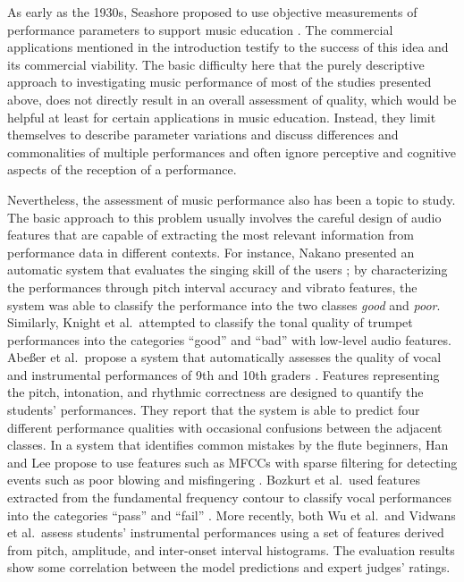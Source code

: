 \documentclass{ws-ijsc}
\begin{document}
As early as the 1930s, Seashore proposed to use objective measurements of performance parameters to support music education \cite{seashore_psychology_1938}. The commercial applications mentioned in the introduction testify to the success of this idea and its commercial viability. The basic difficulty here that the purely descriptive approach to investigating music performance of most of the studies presented above, does not directly result in an overall assessment of quality, which would be helpful at least for certain applications in music education. Instead, they limit themselves to describe parameter variations and discuss differences and commonalities of multiple performances and often ignore perceptive and cognitive aspects of the reception of a performance. 

Nevertheless, the assessment of music performance also has been a topic to study. The basic approach to this problem usually involves the careful design of audio features that are capable of extracting the most relevant information from performance data in different contexts. For instance, Nakano presented an automatic system that evaluates the singing skill of the users \cite{Nakano2006a}; by characterizing the performances through pitch interval accuracy and vibrato features, the system was able to classify the performance into the two classes \textit{good} and \textit{poor}.  Similarly, Knight et al.\ attempted to classify the tonal quality of trumpet performances into the categories ``good'' and ``bad'' with low-level audio features.
Abe{\ss}er et al.\ propose a system that automatically assesses the quality of vocal and instrumental performances of 9th and 10th graders \cite{Abeßer2013}. Features representing the pitch, intonation, and rhythmic correctness are designed to quantify the students' performances. They report that the system is able to predict four different performance qualities with occasional confusions between the adjacent classes. 
In a system that identifies common mistakes by the flute beginners, Han and Lee propose to use features such as MFCCs with sparse filtering for detecting events such as poor blowing and misfingering \cite{Han2014}. Bozkurt et al.\ used features extracted from the fundamental frequency contour to classify vocal performances into the categories ``pass'' and ``fail'' \cite{bozkurt_dataset_2017}.
More recently, both Wu et al.\  and Vidwans et al.\ assess students' instrumental performances using a set of features derived from pitch, amplitude, and inter-onset interval histograms\cite{Wu2016,Vidwans2017}. The evaluation results show some correlation between the model predictions and expert judges' ratings. 
\end{document}

